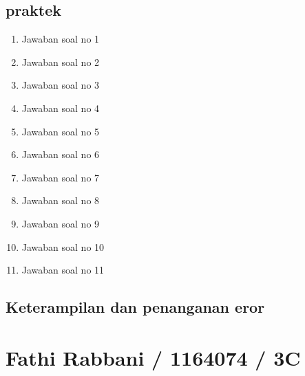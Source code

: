 \subsection{praktek}
\begin{enumerate}
    \item Jawaban soal no 1
    
    \item Jawaban soal no 2
    
    \item Jawaban soal no 3
    
    \item Jawaban soal no 4
    
    \item Jawaban soal no 5
    
    \item Jawaban soal no 6
    
    \item Jawaban soal no 7
    
    \item Jawaban soal no 8
    
    \item Jawaban soal no 9
    
    \item Jawaban soal no 10
    
    \item Jawaban soal no 11
    
\end{enumerate}

\subsection{Keterampilan dan penanganan eror}
    

\section{Fathi Rabbani / 1164074 / 3C}
